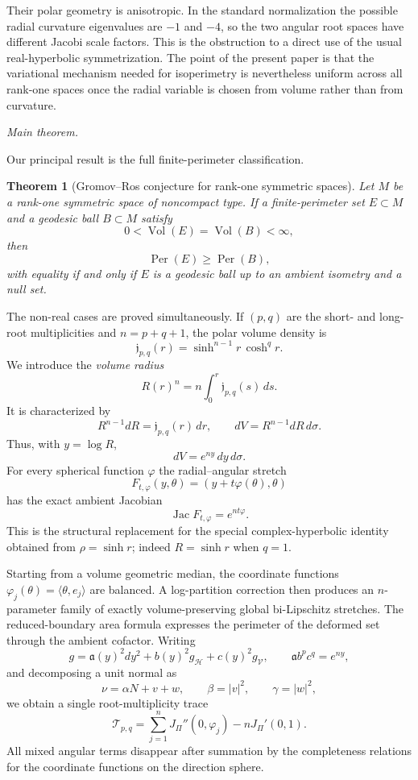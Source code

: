 \documentclass[11pt,reqno]{amsart}
\numberwithin{equation}{section}
\newtheorem{theorem}{Theorem}[section]
\theoremstyle{definition}
\theoremstyle{remark}
\newcommand{\Vol}{\operatorname{Vol}}
\newcommand{\Per}{\operatorname{Per}}
\newcommand{\Jac}{\operatorname{Jac}}
\newcommand{\ithead}[1]{%
  \par\medskip\noindent\textit{#1}\enspace
}
\begin{document}
Their polar geometry is anisotropic.  In the standard normalization the
possible radial curvature eigenvalues are $-1$ and $-4$, so the two angular
root spaces have different Jacobi scale factors.  This is the obstruction to
a direct use of the usual real-hyperbolic symmetrization.  The point of the
present paper is that the variational mechanism needed for isoperimetry is
nevertheless uniform across all rank-one spaces once the radial variable is
chosen from volume rather than from curvature.

\ithead{Main theorem.}
Our principal result is the full finite-perimeter classification.

\begin{theorem}[Gromov--Ros conjecture for rank-one symmetric spaces]
\label{thm:intro-rank-one}
Let $M$ be a rank-one symmetric space of noncompact type.  If a
finite-perimeter set $E\subset M$ and a geodesic ball $B\subset M$ satisfy
\[
 0<\Vol(E)=\Vol(B)<\infty,
\]
then
\[
 \Per(E)\ge \Per(B),
\]
with equality if and only if $E$ is a geodesic ball up to an ambient isometry
and a null set.
\end{theorem}

The non-real cases are proved simultaneously.  If $(p,q)$ are the short- and
long-root multiplicities and $n=p+q+1$, the polar volume density is
\[
 \mathfrak j_{p,q}(r)=\sinh^{n-1}r\,\cosh^q r.
\]
We introduce the \emph{volume radius}
\[
 R(r)^n=n\int_0^r\mathfrak j_{p,q}(s)\,ds.
\]
It is characterized by
\[
 R^{n-1}dR=\mathfrak j_{p,q}(r)\,dr,
 \qquad
 dV=R^{n-1}dR\,d\sigma.
\]
Thus, with $y=\log R$,
\[
 dV=e^{ny}\,dy\,d\sigma.
\]
For every spherical function $\varphi$ the radial--angular stretch
\[
 F_{t,\varphi}(y,\theta)=(y+t\varphi(\theta),\theta)
\]
has the exact ambient Jacobian
\[
 \Jac F_{t,\varphi}=e^{nt\varphi}.
\]
This is the structural replacement for the special complex-hyperbolic
identity obtained from $\rho=\sinh r$; indeed $R=\sinh r$ when $q=1$.

Starting from a volume geometric median, the coordinate functions
$\varphi_j(\theta)=\langle\theta,e_j\rangle$ are balanced.  A log-partition
correction then produces an $n$-parameter family of exactly volume-preserving
global bi-Lipschitz stretches.  The reduced-boundary area formula expresses
the perimeter of the deformed set through the ambient cofactor.  Writing
\[
 g=\mathfrak a(y)^2dy^2+b(y)^2g_{\mathcal H}+c(y)^2g_{\mathcal V},
 \qquad
 \mathfrak a b^pc^q=e^{ny},
\]
and decomposing a unit normal as
\[
 \nu=\alpha N+v+w,
 \qquad
 \beta=|v|^2,
 \qquad
 \gamma=|w|^2,
\]
we obtain a single root-multiplicity trace
\[
 \mathscr T_{p,q}
 =\sum_{j=1}^nJ_\Pi''(0,\varphi_j)-nJ_\Pi'(0,1).
\]
All mixed angular terms disappear after summation by the completeness
relations for the coordinate functions on the direction sphere.
\end{document}
